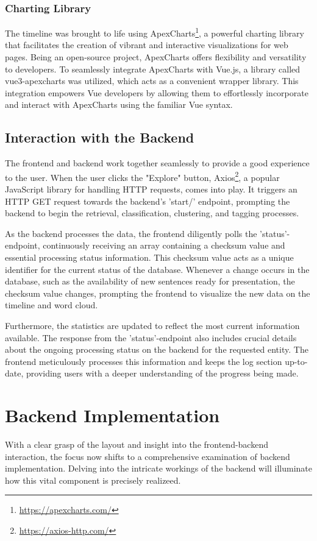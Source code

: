 \documentclass[a4paper,10pt]{report} %
\begin{document}
\subsubsection{Charting Library}
The timeline was brought to life using ApexCharts\footnote{\url{https://apexcharts.com/}}, a powerful charting library that facilitates the creation of vibrant and interactive visualizations for web pages. Being an open-source project, ApexCharts offers flexibility and versatility to developers. To seamlessly integrate ApexCharts with Vue.js, a library called vue3-apexcharts was utilized, which acts as a convenient wrapper library. This integration empowers Vue developers by allowing them to effortlessly incorporate and interact with ApexCharts using the familiar Vue syntax.

\subsection{Interaction with the Backend}
The frontend and backend work together seamlessly to provide a good experience to the user. When the user clicks the "Explore" button, Axios\footnote{\url{https://axios-http.com/}}, a popular JavaScript library for handling HTTP requests, comes into play. It triggers an HTTP GET request towards the backend's 'start/' endpoint, prompting the backend to begin the retrieval, classification, clustering, and tagging processes.

As the backend processes the data, the frontend diligently polls the 'status'-endpoint, continuously receiving an array containing a checksum value and essential processing status information. This checksum value acts as a unique identifier for the current status of the database. Whenever a change occurs in the database, such as the availability of new sentences ready for presentation, the checksum value changes, prompting the frontend to visualize the new data on the timeline and word cloud.

Furthermore, the statistics are updated to reflect the most current information available. The response from the 'status'-endpoint also includes crucial details about the ongoing processing status on the backend for the requested entity. The frontend meticulously processes this information and keeps the log section up-to-date, providing users with a deeper understanding of the progress being made.


\section{Backend Implementation}
With a clear grasp of the layout and insight into the frontend-backend interaction, the focus now shifts to a comprehensive examination of backend implementation. Delving into the intricate workings of the backend will illuminate how this vital component is precisely realizeed.
\end{document}

